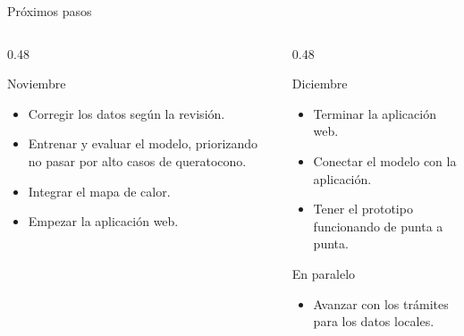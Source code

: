 \begin{frame}{Próximos pasos}
    \begin{columns}[T]
        \begin{column}{0.48\textwidth}
            \begin{block}{Noviembre}
                \begin{itemize}
                    \item Corregir los datos según la revisión.
                    \item Entrenar y evaluar el modelo, priorizando no pasar por alto casos de queratocono.
                    \item Integrar el mapa de calor.
                    \item Empezar la aplicación web.
                \end{itemize}
            \end{block}
        \end{column}
        \begin{column}{0.48\textwidth}
            \begin{block}{Diciembre}
                \begin{itemize}
                    \item Terminar la aplicación web.
                    \item Conectar el modelo con la aplicación.
                    \item Tener el prototipo funcionando de punta a punta.
                \end{itemize}
            \end{block}
            \vspace{0.2cm}
            \begin{block}{En paralelo}
                \begin{itemize}
                    \item Avanzar con los trámites para los datos locales.
                \end{itemize}
            \end{block}
        \end{column}
    \end{columns}
\end{frame}
